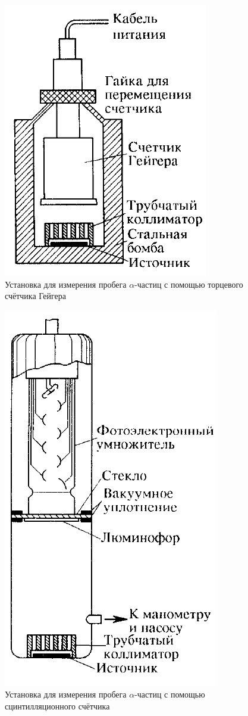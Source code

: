 \documentclass[a4paper, 12pt]{article}
\begin{document}
\begin{figure}[H]
    \includegraphics[scale = 0.4]{Workplace1}
    \centering
    \caption{Установка для измерения пробега $\alpha$-частиц с помощью торцевого счётчика Гейгера}
    \label{img:work1}
\end{figure}

\begin{figure}[H]
    \includegraphics[scale = 0.4]{Workplace2}
    \centering
    \caption{Установка для измерения пробега $\alpha$-частиц с помощью сцинтилляционного счётчика}
    \label{img:work2}
\end{figure}
\end{document}
